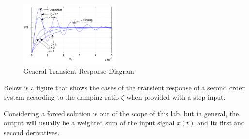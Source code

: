 \begin{figure}[H]
    \centering
    \includegraphics[width=0.45\textwidth]{images/general_intro_behaviour.png}
    \caption{General Transient Response Diagram}
    \label{fig:general_transient_response}
\end{figure}
Below is a figure that shows the cases of the transient response of a second order system according to the damping ratio $\zeta$ when provided with a step input.

Considering a forced solution is out of the scope of this lab, but in general, the output will usually be a weighted sum of the input signal $x(t)$ and its first and second derivatives.
